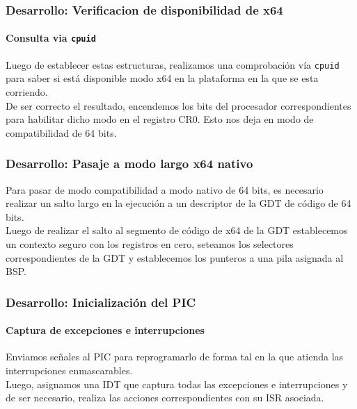 \documentclass{beamer}
\begin{document}
\begin{frame}
  \frametitle{Desarrollo: Verificacion de disponibilidad de x64}
  \framesubtitle{Consulta via \texttt{cpuid}}
  Luego de establecer estas estructuras, realizamos una comprobación vía \texttt{cpuid} para saber si está disponible modo x64 en la plataforma en la que se esta corriendo. \\ 
  \vspace{20pt}
  De ser correcto el resultado, encendemos los bits del procesador correspondientes para habilitar dicho modo en el registro CR0. Esto nos deja en modo de compatibilidad de 64 bits.
\end{frame}

\begin{frame}
  \frametitle{Desarrollo: Pasaje a modo largo x64 nativo}
  Para pasar de modo compatibilidad a modo nativo de 64 bits, es necesario realizar un salto largo en la ejecución a un descriptor de la GDT de código de 64 bits.\\
  \vspace{20pt}
  Luego de realizar el salto al segmento de código de x64 de la GDT establecemos un contexto seguro con los registros en cero, seteamos los selectores correspondientes de la GDT y establecemos los punteros a una pila asignada al BSP.
\end{frame}

\begin{frame}
  \frametitle{Desarrollo: Inicialización del PIC}
  \framesubtitle{Captura de excepciones e interrupciones}
  Enviamos señales al PIC para reprogramarlo de forma tal en la que atienda las interrupciones enmascarables.\\
  \vspace{20pt}
  Luego, asignamos una IDT que captura todas las excepciones e interrupciones y de ser necesario, realiza las acciones correspondientes con su ISR asociada.
\end{frame}

\end{document}
